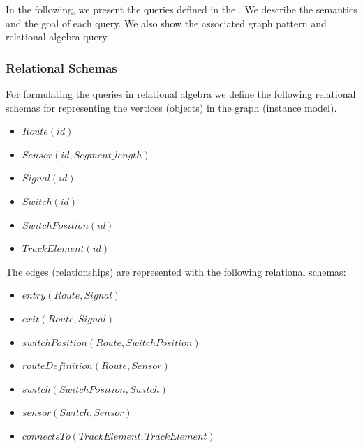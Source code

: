 In the following, we present the queries defined in the \tb{}. We describe the semantics and the goal of each query. We also show the associated graph pattern and relational algebra query.


\subsubsection{Relational Schemas}

For formulating the queries in relational algebra we define the following relational schemas for representing the vertices (objects) in the graph (instance model).

\begin{itemize}
  \item $ \mathit{Route}\left(\mathit{id}\right) $
  \item $ \mathit{Sensor}\left(\mathit{id}, \mathit{Segment\_length}\right) $
  \item $ \mathit{Signal}\left(\mathit{id}\right) $
  \item $ \mathit{Switch}\left(\mathit{id}\right) $
  \item $ \mathit{SwitchPosition}\left(\mathit{id}\right) $
  \item $ \mathit{TrackElement}\left(\mathit{id}\right) $
\end{itemize}

The edges (relationships) are represented with the following relational schemas:

\begin{itemize}
  \item $ \mathit{entry}\left(\mathit{Route}, \mathit{Signal}\right) $
  \item $ \mathit{exit}\left(\mathit{Route}, \mathit{Signal}\right) $
  \item $ \mathit{switchPosition}\left(\mathit{Route}, \mathit{SwitchPosition}\right) $
  \item $ \mathit{routeDefinition}\left(\mathit{Route}, \mathit{Sensor}\right) $
  \item $ \mathit{switch}\left(\mathit{SwitchPosition}, \mathit{Switch}\right) $
  \item $ \mathit{sensor}\left(\mathit{Switch}, \mathit{Sensor}\right) $
  \item $ \mathit{connectsTo}\left(\mathit{TrackElement}, \mathit{TrackElement}\right) $
\end{itemize}

